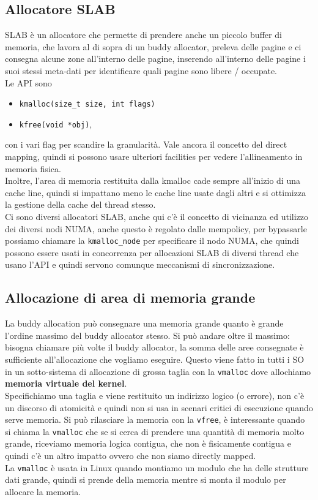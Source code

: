 \documentclass[12pt, oneside]{extbook}
\begin{document}
\subsection{Allocatore SLAB}
SLAB è un allocatore che permette di prendere anche un piccolo buffer di memoria, che lavora al di sopra di un buddy allocator, preleva delle pagine e ci consegna alcune zone all'interno delle pagine, inserendo all'interno delle pagine i suoi stessi meta-dati per identificare quali pagine sono libere / occupate.\\ Le API sono 
\begin{itemize}
	\item[] \texttt{kmalloc(size\_t size, int flags)}
	\item[] \texttt{kfree(void *obj)}, 
\end{itemize}
con i vari flag per scandire la granularità. Vale ancora il concetto del direct mapping, quindi si possono usare ulteriori facilities per vedere l'allineamento in memoria fisica.\\ Inoltre, l'area di memoria restituita dalla kmalloc cade sempre all'inizio di una cache line, quindi si impattano meno le cache line usate dagli altri e si ottimizza la gestione della cache del thread stesso.\\Ci sono diversi allocatori SLAB, anche qui c'è il concetto di vicinanza ed utilizzo dei diversi nodi NUMA, anche questo è regolato dalle mempolicy, per bypassarle possiamo chiamare la \texttt{kmalloc\_node} per specificare il nodo NUMA, che quindi possono essere usati in concorrenza per allocazioni SLAB di diversi thread che usano l'API e quindi servono comunque meccanismi di sincronizzazione.
\subsection{Allocazione di area di memoria grande}
La buddy allocation può consegnare una memoria grande quanto è grande l'ordine massimo del buddy allocator stesso. Si può andare oltre il massimo: bisogna chiamare più volte il buddy allocator, la somma delle aree consegnate è sufficiente all'allocazione che vogliamo eseguire. Questo viene fatto in tutti i SO in un sotto-sistema di allocazione di grossa taglia con la \texttt{vmalloc} dove allochiamo \textbf{memoria virtuale del kernel}.\\Specifichiamo una taglia e viene restituito un indirizzo logico (o errore), non c'è un discorso di atomicità e quindi non si usa in scenari critici di esecuzione quando serve memoria. Si può rilasciare la memoria con la \texttt{vfree}, è interessante quando si chiama la \texttt{vmalloc} che se si cerca di prendere una quantità di memoria molto grande, riceviamo memoria logica contigua, che non è fisicamente contigua e quindi c'è un altro impatto ovvero che non siamo directly mapped.\\La \texttt{vmalloc} è usata in Linux quando montiamo un modulo che ha delle strutture dati grande, quindi si prende della memoria mentre si monta il modulo per allocare la memoria.
\end{document}
